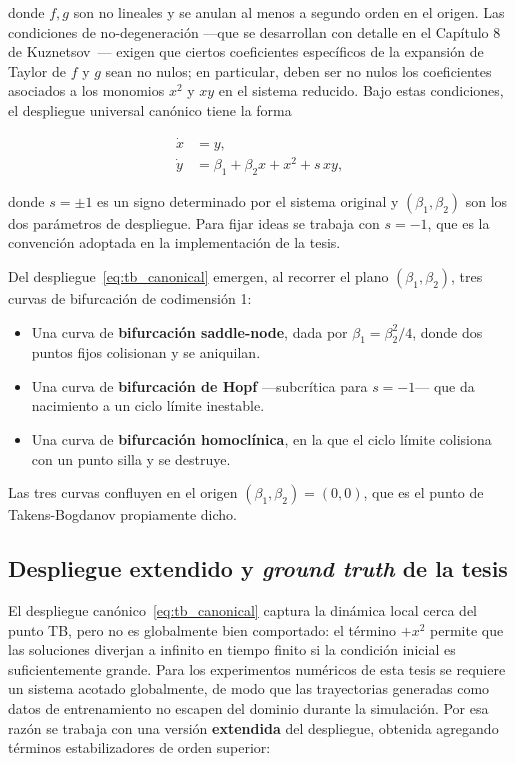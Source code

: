 donde $f, g$ son no lineales y se anulan al menos a segundo orden en el origen. Las condiciones de no-degeneración —que se desarrollan con detalle en el Capítulo 8 de Kuznetsov~\cite{kuznetsov2004}— exigen que ciertos coeficientes específicos de la expansión de Taylor de $f$ y $g$ sean no nulos; en particular, deben ser no nulos los coeficientes asociados a los monomios $x^2$ y $xy$ en el sistema reducido. Bajo estas condiciones, el despliegue universal canónico tiene la forma

\begin{equation}
\begin{aligned}
\dot{x} &= y, \\
\dot{y} &= \beta_1 + \beta_2 x + x^2 + s\, x y,
\end{aligned}
\tag{3.2}
\label{eq:tb_canonical}
\end{equation}

donde $s = \pm 1$ es un signo determinado por el sistema original y $(\beta_1, \beta_2)$ son los dos parámetros de despliegue. Para fijar ideas se trabaja con $s = -1$, que es la convención adoptada en la implementación de la tesis.

Del despliegue~\eqref{eq:tb_canonical} emergen, al recorrer el plano $(\beta_1, \beta_2)$, tres curvas de bifurcación de codimensión 1:

\begin{itemize}
    \item Una curva de \textbf{bifurcación saddle-node}, dada por $\beta_1 = \beta_2^2/4$, donde dos puntos fijos colisionan y se aniquilan.
    \item Una curva de \textbf{bifurcación de Hopf} —subcrítica para $s=-1$— que da nacimiento a un ciclo límite inestable.
    \item Una curva de \textbf{bifurcación homoclínica}, en la que el ciclo límite colisiona con un punto silla y se destruye.
\end{itemize}

Las tres curvas confluyen en el origen $(\beta_1, \beta_2) = (0, 0)$, que es el punto de Takens-Bogdanov propiamente dicho.

\subsection{Despliegue extendido y \textit{ground truth} de la tesis}

El despliegue canónico~\eqref{eq:tb_canonical} captura la dinámica local cerca del punto TB, pero no es globalmente bien comportado: el término $+x^2$ permite que las soluciones diverjan a infinito en tiempo finito si la condición inicial es suficientemente grande. Para los experimentos numéricos de esta tesis se requiere un sistema acotado globalmente, de modo que las trayectorias generadas como datos de entrenamiento no escapen del dominio durante la simulación. Por esa razón se trabaja con una versión \textbf{extendida} del despliegue, obtenida agregando términos estabilizadores de orden superior:

